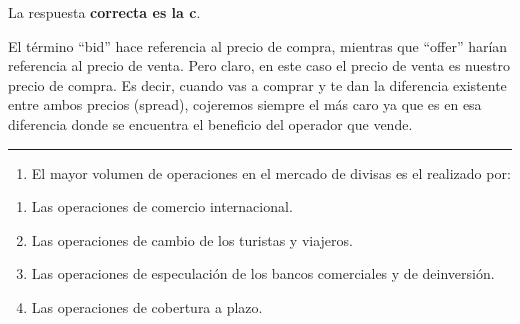 \documentclass[
  letterpaper,
  DIV=11,
  numbers=noendperiod]{scrreprt}
\providecommand{\tightlist}{%
  \setlength{\itemsep}{0pt}\setlength{\parskip}{0pt}}\usepackage{longtable,booktabs,array}
\begin{document}
\begin{tcolorbox}[enhanced jigsaw, left=2mm, opacityback=0, colback=white, breakable, arc=.35mm, bottomrule=.15mm, rightrule=.15mm, toprule=.15mm, leftrule=.75mm, colframe=quarto-callout-tip-color-frame]
\begin{minipage}[t]{5.5mm}
\textcolor{quarto-callout-tip-color}{\faLightbulb}
\end{minipage}%
\begin{minipage}[t]{\textwidth - 5.5mm}

La respuesta \textbf{correcta es la c}.

El término ``bid'' hace referencia al precio de compra, mientras que
``offer'' harían referencia al precio de venta. Pero claro, en este caso
el precio de venta es nuestro precio de compra. Es decir, cuando vas a
comprar y te dan la diferencia existente entre ambos precios (spread),
cojeremos siempre el más caro ya que es en esa diferencia donde se
encuentra el beneficio del operador que vende.

\end{minipage}%
\end{tcolorbox}

\begin{center}\rule{0.5\linewidth}{0.5pt}\end{center}

\begin{enumerate}
\def\labelenumi{\arabic{enumi}.}
\setcounter{enumi}{14}
\tightlist
\item
  El mayor volumen de operaciones en el mercado de divisas es el
  realizado por:
\end{enumerate}

\begin{enumerate}
\def\labelenumi{\alph{enumi})}
\item
  Las operaciones de comercio internacional.
\item
  Las operaciones de cambio de los turistas y viajeros.
\item
  Las operaciones de especulación de los bancos comerciales y de
  deinversión.
\item
  Las operaciones de cobertura a plazo.
\end{enumerate}
\end{document}
